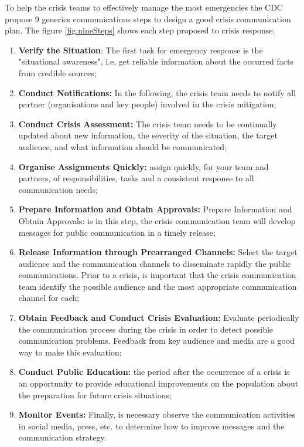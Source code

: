 To help the crisis teams to effectively manage the most emergencies the CDC \cite{centers2006crisis} propose 9 generics communications steps to design a good crisis communication plan. The figure \ref{fig:nineSteps} shows each step proposed to crisis response.

\begin{enumerate}
   \item \textbf{Verify the Situation}: The first task for emergency response is the "situational awareness", i.e, get reliable information about the occurred facts from credible sources; 
   \item  \textbf{Conduct Notifications:} In the following, the crisis team needs to notify all partner (organisations and key people) involved in the crisis mitigation;
   \item  \textbf{Conduct Crisis Assessment:} The crisis team needs  to be continually updated about new information,  the severity of the situation, the target audience, and what information should be communicated;
   \item \textbf{Organise Assignments Quickly:} assign quickly, for your team and partners, of responsibilities, tasks and a consistent response to all communication needs; 
   \item \textbf{Prepare Information and Obtain Approvals:} Prepare Information and Obtain Approvals: is in this step, the crisis communication team will develop messages for public communication in a timely release;
   \item \textbf{Release Information through Prearranged Channels:} Select the target audience and the communication channels to disseminate rapidly the public communications. Prior to a crisis, is important that the crisis communication team identify the possible audience and the most appropriate communication channel for each;
   \item \textbf{Obtain Feedback and Conduct Crisis Evaluation:} Evaluate periodically the communication process during the crisis in order to detect possible communication problems. Feedback from key audience and media are a good way to make this evaluation;   
   \item \textbf{Conduct Public Education:} the period after the occurrence of a crisis is an opportunity to provide educational improvements on the population about the preparation for future crisis situations;   
   \item \textbf{Monitor Events:} Finally, is necessary observe the communication activities in social media, press, etc. to determine how to improve messages and the communication strategy. 
\end{enumerate}   

